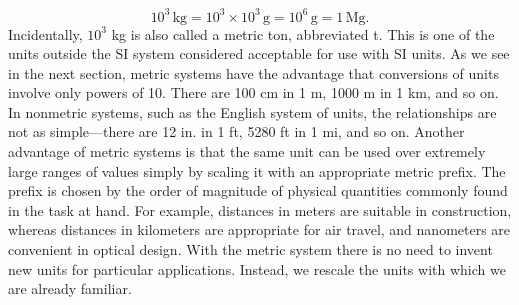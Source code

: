 \documentclass{report}
\begin{document}
    \bigbreak \noindent 
    \[ 10^3 \, \text{kg} = 10^3 \times 10^3 \, \text{g} = 10^6 \, \text{g} = 1 \, \text{Mg}. \]
    \bigbreak \noindent 
    Incidentally, $10^3$ kg is also called a metric ton, abbreviated t. This is one of the units outside the SI system considered acceptable for use with SI units.
    \bigbreak \noindent 
    As we see in the next section, metric systems have the advantage that conversions of units involve only powers of 10. There are 100 cm in 1 m, 1000 m in 1 km, and so on. In nonmetric systems, such as the English system of units, the relationships are not as simple---there are 12 in. in 1 ft, 5280 ft in 1 mi, and so on.
    \bigbreak \noindent 
    Another advantage of metric systems is that the same unit can be used over extremely large ranges of values simply by scaling it with an appropriate metric prefix. The prefix is chosen by the order of magnitude of physical quantities commonly found in the task at hand. For example, distances in meters are suitable in construction, whereas distances in kilometers are appropriate for air travel, and nanometers are convenient in optical design. With the metric system there is no need to invent new units for particular applications. Instead, we rescale the units with which we are already familiar.
\end{document}
